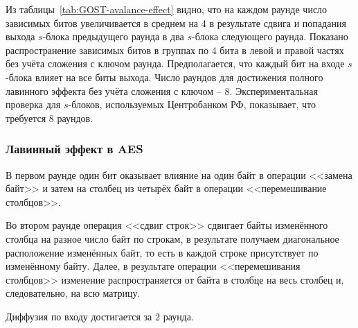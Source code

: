 Из таблицы~\ref{tab:GOST-avalance-effect} видно, что на каждом раунде число зависимых битов увеличивается в среднем на 4 в результате сдвига и попадания выхода $s$-блока предыдущего раунда в два $s$-блока следующего раунда. Показано распространение зависимых битов в группах по 4 бита в левой и правой частях без учёта сложения с ключом раунда. Предполагается, что каждый бит на входе $s$-блока влияет на все биты выхода. Число раундов для достижения полного лавинного эффекта без учёта сложения с ключом -- 8. Экспериментальная проверка для $s$-блоков, используемых Центробанком РФ, показывает, что требуется 8 раундов.


\subsubsection{Лавинный эффект в AES}

В первом раунде один бит оказывает влияние на один байт в операции <<замена байт>> и затем на столбец из четырёх байт в операции <<перемешивание столбцов>>.

Во втором раунде операция <<сдвиг строк>> сдвигает байты изменённого столбца на разное число байт по строкам, в результате получаем диагональное расположение изменённых байт, то есть в каждой строке присутствует по изменённому байту. Далее, в результате операции <<перемешивания столбцов>> изменение распространяется от байта в столбце на весь столбец и, следовательно, на всю матрицу.

Диффузия по входу достигается за 2 раунда.
